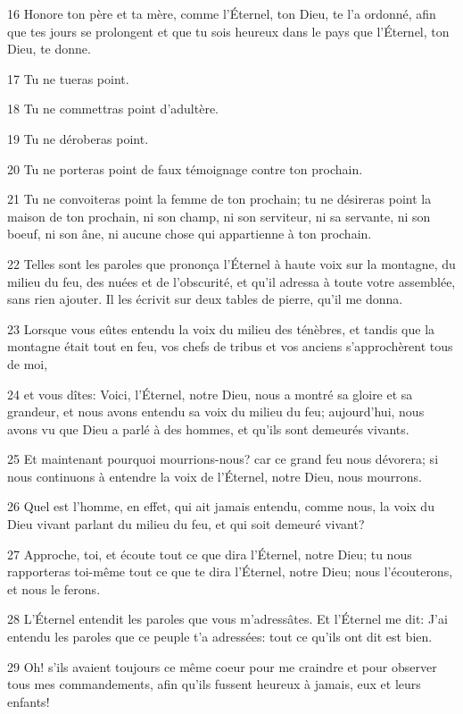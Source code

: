 \par 16 Honore ton père et ta mère, comme l'Éternel, ton Dieu, te l'a ordonné, afin que tes jours se prolongent et que tu sois heureux dans le pays que l'Éternel, ton Dieu, te donne.
\par 17 Tu ne tueras point.
\par 18 Tu ne commettras point d'adultère.
\par 19 Tu ne déroberas point.
\par 20 Tu ne porteras point de faux témoignage contre ton prochain.
\par 21 Tu ne convoiteras point la femme de ton prochain; tu ne désireras point la maison de ton prochain, ni son champ, ni son serviteur, ni sa servante, ni son boeuf, ni son âne, ni aucune chose qui appartienne à ton prochain.
\par 22 Telles sont les paroles que prononça l'Éternel à haute voix sur la montagne, du milieu du feu, des nuées et de l'obscurité, et qu'il adressa à toute votre assemblée, sans rien ajouter. Il les écrivit sur deux tables de pierre, qu'il me donna.
\par 23 Lorsque vous eûtes entendu la voix du milieu des ténèbres, et tandis que la montagne était tout en feu, vos chefs de tribus et vos anciens s'approchèrent tous de moi,
\par 24 et vous dîtes: Voici, l'Éternel, notre Dieu, nous a montré sa gloire et sa grandeur, et nous avons entendu sa voix du milieu du feu; aujourd'hui, nous avons vu que Dieu a parlé à des hommes, et qu'ils sont demeurés vivants.
\par 25 Et maintenant pourquoi mourrions-nous? car ce grand feu nous dévorera; si nous continuons à entendre la voix de l'Éternel, notre Dieu, nous mourrons.
\par 26 Quel est l'homme, en effet, qui ait jamais entendu, comme nous, la voix du Dieu vivant parlant du milieu du feu, et qui soit demeuré vivant?
\par 27 Approche, toi, et écoute tout ce que dira l'Éternel, notre Dieu; tu nous rapporteras toi-même tout ce que te dira l'Éternel, notre Dieu; nous l'écouterons, et nous le ferons.
\par 28 L'Éternel entendit les paroles que vous m'adressâtes. Et l'Éternel me dit: J'ai entendu les paroles que ce peuple t'a adressées: tout ce qu'ils ont dit est bien.
\par 29 Oh! s'ils avaient toujours ce même coeur pour me craindre et pour observer tous mes commandements, afin qu'ils fussent heureux à jamais, eux et leurs enfants!
